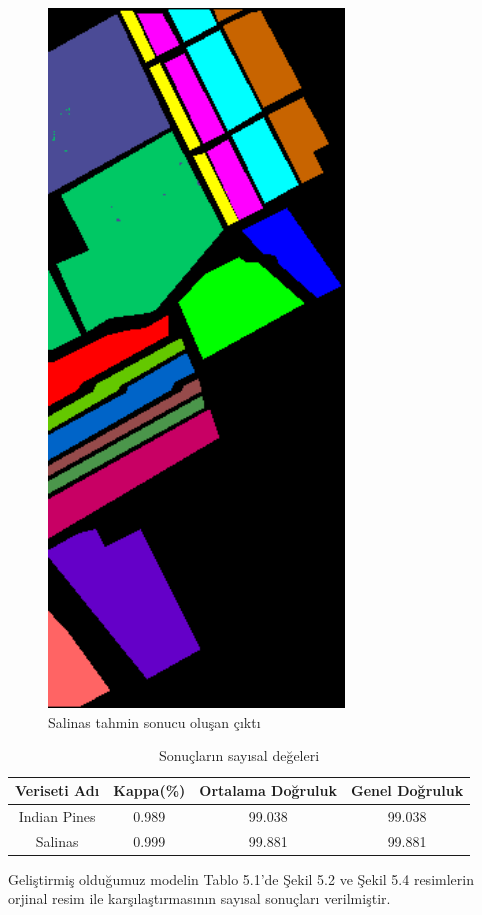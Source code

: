 \begin{figure}[!ht]
\begin{minipage}[c]{0.4\linewidth}
        \includegraphics[width=0.7\textwidth]{Figures/SA_predicted_.png}
        \caption{Salinas tahmin sonucu oluşan çıktı }
    \end{minipage}%
\end{figure}
\newpage

\vspace{2cm}
\begin{table}[!ht]
\centering
    \begin{threeparttable} %
    \caption{Sonuçların sayısal değeleri}
        \begin{tabular}{|c|c|c|c|}
        \hline
        \textbf{Veriseti Adı} & \textbf{Kappa(\%)} & \textbf{Ortalama Doğruluk} & \textbf{Genel Doğruluk} \\ \hline
        Indian Pines & 0.989    & 99.038           & 99.038         \\ \hline
        Salinas & 0.999    & 99.881          & 99.881         \\ \hline
        \end{tabular}
    \end{threeparttable} %
\end{table}

Geliştirmiş olduğumuz modelin Tablo 5.1'de Şekil 5.2 ve Şekil 5.4 resimlerin orjinal resim ile karşılaştırmasının sayısal sonuçları verilmiştir.


